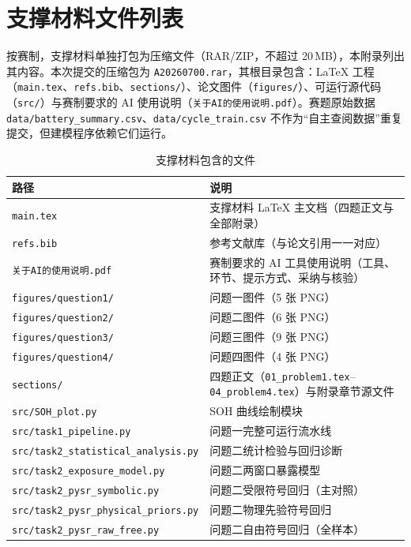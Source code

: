 \section{支撑材料文件列表}

按赛制，支撑材料单独打包为压缩文件（RAR/ZIP，不超过 20\,MB），本附录列出其内容。本次提交的压缩包为 \texttt{A20260700.rar}，其根目录包含：LaTeX 工程（\texttt{main.tex}、\texttt{refs.bib}、\texttt{sections/}）、论文图件（\texttt{figures/}）、可运行源代码（\texttt{src/}）与赛制要求的 AI 使用说明（\texttt{关于AI的使用说明.pdf}）。赛题原始数据 \texttt{data/battery\_summary.csv}、\texttt{data/cycle\_train.csv} 不作为“自主查阅数据”重复提交，但建模程序依赖它们运行。

\begin{table}[htbp]
\centering
\caption{支撑材料包含的文件}
\label{tab:support}
\small
\begin{tabular}{p{}p{}}
\toprule
路径 & 说明 \\
\midrule
\texttt{main.tex} & 支撑材料 LaTeX 主文档（四题正文与全部附录） \\
\texttt{refs.bib} & 参考文献库（与论文引用一一对应） \\
\texttt{关于AI的使用说明.pdf} & 赛制要求的 AI 工具使用说明（工具、环节、提示方式、采纳与核验） \\
\texttt{figures/question1/} & 问题一图件（5 张 PNG） \\
\texttt{figures/question2/} & 问题二图件（6 张 PNG） \\
\texttt{figures/question3/} & 问题三图件（9 张 PNG） \\
\texttt{figures/question4/} & 问题四图件（4 张 PNG） \\
\texttt{sections/} & 四题正文（\texttt{01\_problem1.tex}--\texttt{04\_problem4.tex}）与附录章节源文件 \\
\texttt{src/SOH\_plot.py} & SOH 曲线绘制模块 \\
\texttt{src/task1\_pipeline.py} & 问题一完整可运行流水线 \\
\texttt{src/task2\_statistical\_analysis.py} & 问题二统计检验与回归诊断 \\
\texttt{src/task2\_exposure\_model.py} & 问题二两窗口暴露模型 \\
\texttt{src/task2\_pysr\_symbolic.py} & 问题二受限符号回归（主对照） \\
\texttt{src/task2\_pysr\_physical\_priors.py} & 问题二物理先验符号回归 \\
\texttt{src/task2\_pysr\_raw\_free.py} & 问题二自由符号回归（全样本） \\

\end{tabular}
\end{table}
